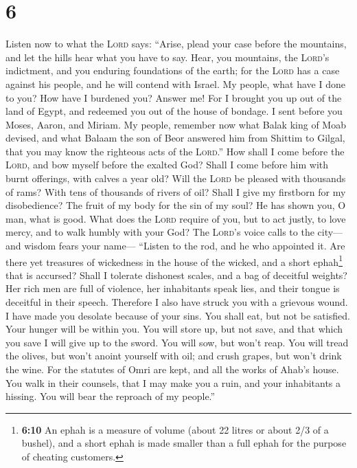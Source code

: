 \hypertarget{section-5}{%
\section{6}\label{section-5}}

 Listen now to what the \textsc{Lord} says: ``Arise, plead
your case before the mountains, and let the hills hear what you have to
say.  Hear, you mountains, the \textsc{Lord}'s indictment,
and you enduring foundations of the earth; for the \textsc{Lord} has a
case against his people, and he will contend with Israel. 
My people, what have I done to you? How have I burdened you? Answer me!
 For I brought you up out of the land of Egypt, and
redeemed you out of the house of bondage. I sent before you Moses,
Aaron, and Miriam.  My people, remember now what Balak
king of Moab devised, and what Balaam the son of Beor answered him from
Shittim to Gilgal, that you may know the righteous acts of the
\textsc{Lord}.''  How shall I come before the
\textsc{Lord}, and bow myself before the exalted God? Shall I come
before him with burnt offerings, with calves a year old? 
Will the \textsc{Lord} be pleased with thousands of rams? With tens of
thousands of rivers of oil? Shall I give my firstborn for my
disobedience? The fruit of my body for the sin of my soul?
 He has shown you, O man, what is good. What does the
\textsc{Lord} require of you, but to act justly, to love mercy, and to
walk humbly with your God?  The \textsc{Lord}'s voice
calls to the city--- and wisdom fears your name--- ``Listen to the rod,
and he who appointed it.  Are there yet treasures of
wickedness in the house of the wicked, and a short ephah\footnote{\textbf{6:10}
  An ephah is a measure of volume (about 22 litres or about 2/3 of a
  bushel), and a short ephah is made smaller than a full ephah for the
  purpose of cheating customers.} that is accursed? 
Shall I tolerate dishonest scales, and a bag of deceitful weights?
 Her rich men are full of violence, her inhabitants speak
lies, and their tongue is deceitful in their speech. 
Therefore I also have struck you with a grievous wound. I have made you
desolate because of your sins.  You shall eat, but not be
satisfied. Your hunger will be within you. You will store up, but not
save, and that which you save I will give up to the sword.
 You will sow, but won't reap. You will tread the olives,
but won't anoint yourself with oil; and crush grapes, but won't drink
the wine.  For the statutes of Omri are kept, and all the
works of Ahab's house. You walk in their counsels, that I may make you a
ruin, and your inhabitants a hissing. You will bear the reproach of my
people.''

